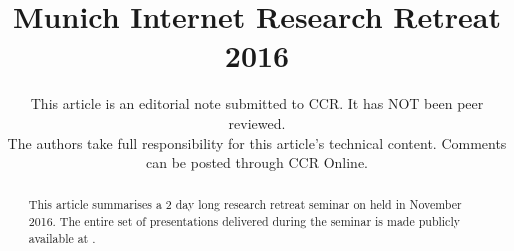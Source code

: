 \documentclass{sig-alternate}
\begin{document}
\title{Munich Internet Research Retreat 2016}

\author{
\begin{tabular}{c}
{\normalsize This article is an editorial note submitted to CCR. It has NOT
been peer reviewed.}\\
{\normalsize The authors take full responsibility for this article's
technical content. Comments can be posted through CCR Online.}
\end{tabular}
}

\maketitle

\begin{abstract}

This article summarises a 2 day long research retreat seminar on  held in
November 2016.  The entire set of presentations delivered during the seminar
is made publicly available at \cite{mir-materials}.

\end{abstract}

\end{document}
